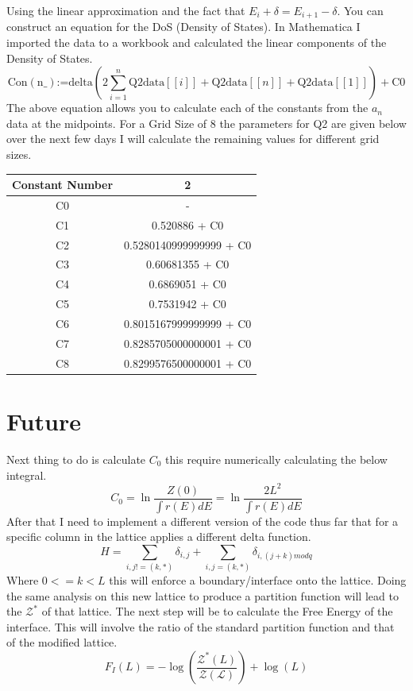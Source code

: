 \documentclass[10pt,a4paper]{article}
\begin{document}
Using the linear approximation and the fact that $E_{i}+\delta = E_{i+1}-\delta$. You can construct an equation for the DoS (Density of States).
In Mathematica I imported the data to a workbook and calculated the linear components of the Density of States.
\begin{equation}
\text{Con}(\text{n$\_$})\text{:=}\text{delta} \left(2 \sum _{i=1}^n \text{Q2data}[[i]]+\text{Q2data}[[n]]+\text{Q2data}[[1]]\right)+\text{C0}
\end{equation}
The above equation allows you to calculate each of the constants from the $a_n$ data at the midpoints.
For a Grid Size of 8 the parameters for Q2 are given below over the next few days I will calculate the remaining values for different grid sizes.
\begin{table}[H]
\centering
\begin{tabular}{|c|c|}
\hline
Constant Number & 2 \\ \hline
C0 & - \\ \hline
C1 & 0.520886 + C0 \\ \hline
C2 & 0.5280140999999999 + C0 \\ \hline
C3 & 0.60681355 + C0 \\ \hline
C4 & 0.6869051 + C0 \\ \hline
C5 & 0.7531942 + C0 \\ \hline
C6 & 0.8015167999999999 + C0 \\ \hline
C7 & 0.8285705000000001 + C0 \\ \hline
C8 & 0.8299576500000001 + C0 \\ \hline
\end{tabular}
\end{table}
\newpage
\section{Future}
Next thing to do is calculate $C_0$ this require numerically calculating the below integral.
\begin{equation}
    C_0 = \ln{\frac{Z(0)}{\int r(E) dE}} = \ln{\frac{2L^2}{\int r(E) dE}}
\end{equation}
After that I need to implement a different version of the code thus far that for a specific column in the lattice applies a different delta function.
\begin{equation}
    H = \sum_{i,j!=(k,*)}\delta_{i,j} + \sum_{i,j=(k,*)}\delta_{i,(j+k)modq}
\end{equation}
Where $ 0 <= k < L$ this will enforce a boundary/interface onto the lattice.
Doing the same analysis on this new lattice to produce a partition function will lead to the $\mathcal{Z}^*$ of that lattice.
The next step will be to calculate the Free Energy of the interface.
This will involve the ratio of the standard partition function and that of the modified lattice.
\begin{equation}
F_{I}(L)=-\log(\frac{\mathcal{Z}^{*}(L)}{\mathcal{Z(L)}}) + \log(L)
\end{equation}




\end{document}
